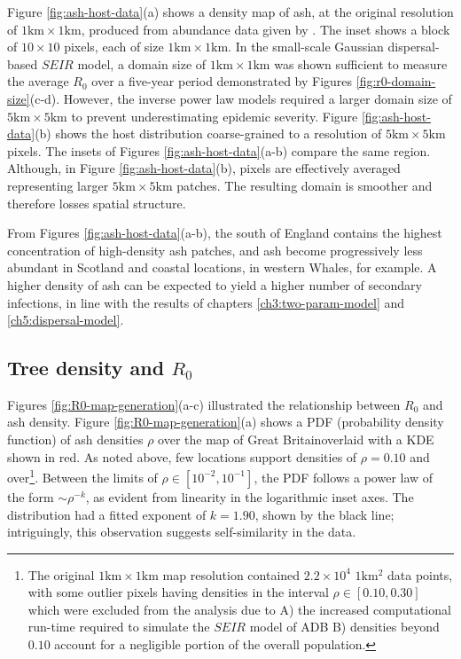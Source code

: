Figure \ref{fig:ash-host-data}(a) shows a density map of ash, at the original resolution of $\mathrm{1km}\times \mathrm{1km}$, produced from abundance data given by \cite{hill.data}.
The inset shows a block of $10\times10$ pixels, each of size $1\mathrm{km} \times 1 \mathrm{km}$.
In the small-scale Gaussian dispersal-based $SEIR$ model, a domain size of $\mathrm{1km}\times \mathrm{1km}$ was shown sufficient to measure the average $R_0$ over a five-year period \textemdash demonstrated by Figures \ref{fig:r0-domain-size}(c-d).
However, the inverse power law models required a larger domain size of $\mathrm{5km}\times \mathrm{5km}$ to prevent underestimating epidemic severity.
Figure \ref{fig:ash-host-data}(b) shows the host distribution coarse-grained to a resolution of $\mathrm{5km}\times \mathrm{5km}$ pixels.
The insets of Figures \ref{fig:ash-host-data}(a-b) compare the same region.
Although, in Figure \ref{fig:ash-host-data}(b), pixels are effectively averaged representing larger $5\mathrm{km} \times 5 \mathrm{km}$ patches.
The resulting domain is smoother and therefore losses spatial structure.

From Figures \ref{fig:ash-host-data}(a-b), the south of England contains the highest concentration of high-density ash patches, and ash become progressively less abundant in Scotland and coastal locations, 
in western Whales, for example. 
A higher density of ash can be expected to yield a higher number of secondary infections, in line with the results of chapters \ref{ch3:two-param-model} and \ref{ch5:dispersal-model}.

\subsection{Tree density and $R_0$}
\label{section:r0-tree-density}

Figures \ref{fig:R0-map-generation}(a-c) illustrated the relationship between $R_0$ and ash density.
Figure \ref{fig:R0-map-generation}(a) shows a PDF (probability density function) of ash densities $\rho$ over the map of Great Britain\textemdash overlaid with a KDE shown in red.
As noted above, few locations support densities of $\rho=0.10$ and over\footnote{
The original $\mathrm{1km \times 1km}$ map resolution contained $2.2\times 10^4$ $1\mathrm{km^2}$ data points, 
with some outlier pixels having densities in the interval $\rho \in [0.10, 0.30]$ which were excluded from the analysis due to 
A) the increased computational run-time required to simulate the $SEIR$ model of ADB  
B) densities beyond $0.10$ account for a negligible portion of the overall population.}. 
Between the limits of $\rho \in [10^{-2}, 10^{-1}]$, the PDF follows a power law of the form $\sim \rho ^{-k}$, as evident from linearity in the logarithmic inset axes.
The distribution had a fitted exponent of $k=1.90$, shown by the black line; 
intriguingly, this observation suggests self-similarity in the data.

